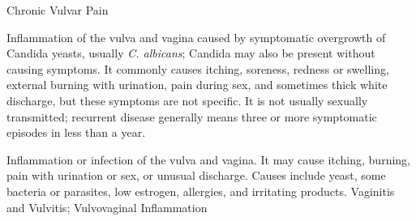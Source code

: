 \synonyms
Chronic Vulvar Pain

 Inflammation of the vulva and vagina caused by
symptomatic overgrowth of Candida yeasts, usually \textit{C. albicans}; Candida may also be
present without causing symptoms. It commonly causes itching, soreness, redness or
swelling, external burning with urination, pain during sex, and sometimes thick white
discharge, but these symptoms are not specific. It is not usually sexually transmitted;
recurrent disease generally means three or more symptomatic episodes in less than a year.

 Inflammation or infection of the vulva and vagina. It may cause itching, burning, pain with urination or sex, or unusual discharge. Causes include yeast, some bacteria or parasites, low estrogen, allergies, and irritating products.
\synonyms
Vaginitis and Vulvitis; Vulvovaginal Inflammation
